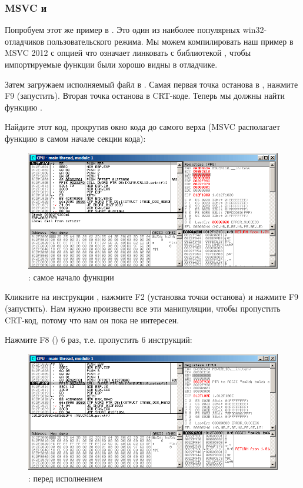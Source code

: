 

\ifdefined\IncludeOlly
\clearpage
\subsubsection{MSVC и \olly}
\myindex{\olly}

Попробуем этот же пример в \olly.
Это один из наиболее популярных win32-отладчиков пользовательского режима.
Мы можем компилировать наш пример в MSVC 2012 
с опцией  что означает линковать с библиотекой ,
чтобы импортируемые функции были хорошо видны в отладчике.

Затем загружаем исполняемый файл в \olly.
Самая первая точка останова в , нажмите F9 (запустить).
Вторая точка останова в \ac{CRT}-коде.
Теперь мы должны найти функцию \main.

Найдите этот код, прокрутив окно кода до самого верха (MSVC располагает функцию \main в самом начале секции кода): 

\begin{figure}[H]
\centering
\includegraphics[scale=\FigScale]{patterns/03_printf/x86/olly3_1.png}
\caption{\olly: самое начало функции \main}
\label{fig:printf3_olly_1}
\end{figure}

Кликните на инструкции , нажмите F2 (установка точки останова) и нажмите F9 (запустить).
Нам нужно произвести все эти манипуляции, чтобы пропустить \ac{CRT}-код, потому что нам он пока
не интересен.

\clearpage
Нажмите F8 (\stepover) 6 раз, т.е. пропустить 6 инструкций:

\begin{figure}[H]
\centering
\includegraphics[scale=\FigScale]{patterns/03_printf/x86/olly3_2.png}
\caption{\olly: перед исполнением \printf}
\label{fig:printf3_olly_2}
\end{figure}

